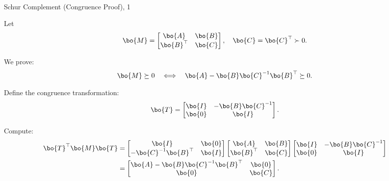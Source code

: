 \documentclass{beamer}
\begin{document}
\begin{frame}{Schur Complement (Congruence Proof), 1}
	\begin{flushleft}
		
		Let 
		\[
		\bo{M} = 
		\begin{bmatrix}
			\bo{A} & \bo{B} \\
			\bo{B}^\top & \bo{C}
		\end{bmatrix},
		\quad \bo{C} = \bo{C}^\top \succ 0.
		\]
		
		We prove:
		\[
		\bo{M} \succeq 0 
		\quad \Longleftrightarrow \quad
		\bo{A} - \bo{B}\bo{C}^{-1}\bo{B}^\top \succeq 0.
		\]
		
		Define the congruence transformation:
		\[
		\bo{T} =
		\begin{bmatrix}
			\bo{I} & -\bo{B}\bo{C}^{-1} \\
			\bo{0} & \bo{I}
		\end{bmatrix}.
		\]
		
		Compute:
		\begin{align}
			\bo{T}^\top \bo{M} \bo{T}
			&=
			\begin{bmatrix}
				\bo{I} & \bo{0} \\
				-\bo{C}^{-1}\bo{B}^\top & \bo{I}
			\end{bmatrix}
			\begin{bmatrix}
				\bo{A} & \bo{B} \\
				\bo{B}^\top & \bo{C}
			\end{bmatrix}
			\begin{bmatrix}
				\bo{I} & -\bo{B}\bo{C}^{-1} \\
				\bo{0} & \bo{I}
			\end{bmatrix} \\
			&=
			\begin{bmatrix}
				\bo{A} - \bo{B}\bo{C}^{-1}\bo{B}^\top & \bo{0} \\
				\bo{0} & \bo{C}
			\end{bmatrix}.
		\end{align}
		
	\end{flushleft}
\end{frame}
\end{document}
